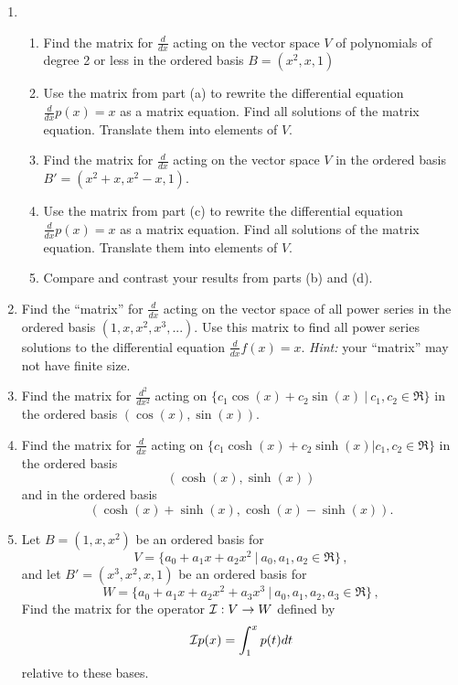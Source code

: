 \begin{enumerate}
\item
\begin{enumerate}
\item
Find the matrix for $\frac{d}{dx}$ acting on the vector space $V$ of polynomials of degree 2 or less in  the ordered basis $B=(x^2,x,1)$\\
\item Use the matrix from part (a) to rewrite the differential equation $\frac{d}{dx} p(x)=x$ as a matrix equation. Find all solutions of the matrix equation. Translate them into elements of $V$.\\\item Find  the matrix for $\frac{d}{dx}$ acting on the vector space $V$  in the ordered basis  $B'=(x^2+x,x^2-x,1)$.\\ 
\item  Use the matrix from part (c) to rewrite the differential equation $\frac{d}{dx} p(x)=x$ as a matrix equation. Find all solutions of the matrix equation. Translate them into elements of $V$.\\
\item Compare and contrast your results from parts (b) and (d).
\end{enumerate}

\item Find the ``matrix'' for $\frac{d}{dx}$ acting on the vector space of all power series in the ordered basis $(1,x,x^2,x^3,...)$. Use this matrix to find all power series solutions to the differential equation $\frac{d}{dx} f(x)=x$. {\it Hint:} your ``matrix'' may not have finite size.\\


\item Find the matrix for $\frac{d^2}{dx^2}$ acting on 
$\{ c_1 \cos(x)+c_2 \sin(x)  ~|~c_1,c_2\in \Re\}$ in the ordered basis $(\cos(x),\sin(x))$.\\

\item Find the matrix for $\frac{d}{dx}$ acting on $\{ c_1 \cosh(x)+c_2 \sinh(x) |c_1,c_2\in \Re\}$ in the ordered basis 
$$(\cosh(x),\sinh(x))$$ 
and in the ordered basis  $$(\cosh(x)+\sinh(x), \cosh(x)-\sinh(x)).$$

\item Let $B=(1,x,x^2)$ be an ordered basis for
$$V=\{ a_0+a_1x+a_2x^2~|~ a_0,a_1,a_2 \in \Re\}\, ,$$ 
and let 
$B'=(x^3,x^2,x,1)$ be an ordered basis for 
$$W=\{ a_0+a_1x+a_2x^2+a_3x^3 ~|~  a_0,a_1,a_2,a_3 \in \Re\}\, ,$$  
Find the matrix for the operator ${\cal I}:V\to W$  defined by $${\cal I}p(x)=\int_1^x p(t)dt$$ relative to these bases.



\end{enumerate}
